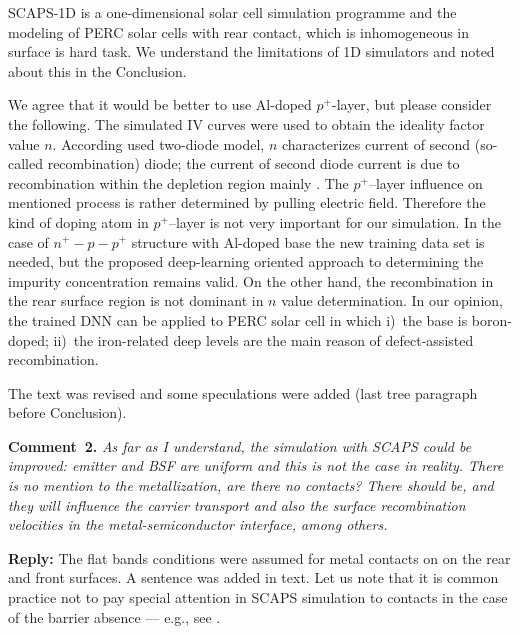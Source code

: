 \documentclass[num-refs]{wiley-article} %
\begin{document}
SCAPS-1D is a one-dimensional solar cell simulation programme and
the modeling of PERC solar cells with rear contact, which is
inhomogeneous in surface is hard task.
We understand the limitations of 1D simulators and noted about this in the Conclusion.

We agree that it would be better to use Al-doped $p^+$-layer, but please consider the following.
The simulated IV curves were used to obtain the ideality factor value $n$.
According used two-diode model,
$n$ characterizes current of second (so-called recombination)  diode;
the current of second diode current is due to recombination within
the depletion region mainly \citep{Breitenstein2013,n2McIntosh}.
The $p^+$--layer influence on mentioned process is rather determined by
pulling electric field.
Therefore the kind of doping atom in $p^+$--layer is not very important for our simulation.
In the case of $n^+-p-p^+$ structure with Al-doped base the new training data set is needed,
but the proposed deep-learning oriented approach to determining the impurity concentration remains valid.
On the other hand, the recombination in the rear surface region is not dominant
in $n$ value determination.
In our opinion, the trained DNN can be applied to PERC solar cell in which
i)~the base is boron-doped;
ii)~the iron-related deep levels are the main reason of defect-assisted recombination.


The text was revised and some speculations were added (last tree paragraph before Conclusion).


\vspace{1cm}
\noindent
\textcolor[rgb]{0.00,0.50,1.00}{\textbf{Comment~2.}}
\emph{As far as I understand, the simulation with SCAPS could be improved: emitter and BSF are uniform and this is not the case in reality.
There is no mention to the metallization, are there no contacts?
There should be, and they will influence the carrier transport and also the surface recombination velocities in the metal-semiconductor interface, among others.}

\vspace{0.5cm}
\noindent
\textcolor[rgb]{0.51,0.00,0.00}{\textbf{Reply:}}
The flat bands conditions were assumed for metal contacts on on the rear and
front surfaces.
A sentence was added in text. 
Let us note that it is common practice not to pay special attention in SCAPS simulation 
to contacts in the case of
the barrier absence --- e.g., see \cite{SCAPSuseSi4,SCAPSuseSi1,SCAPSuse1,SCAPSuse5,ScapsUse10}.
\end{document}
